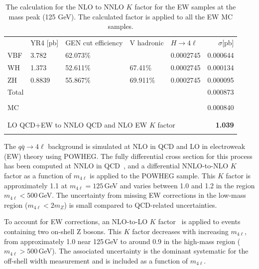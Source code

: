 \begin{table}[!hbt]
\begin{center}
\small
\begin{tabular}{lllllr}
\vspace{-0.2cm} \\
\hline
    & YR4 [pb]    & GEN cut efficiency  & V hadronic & $H\to4\ell$ & $\sigma $[pb]   \\
\hline
VBF & 3.782    & 62.073\% &    & 0.0002745 &  0.000644  \\
WH  & 1.373    & 52.611\% & 67.41\%  & 0.0002745 &  0.000134 \\
ZH  & 0.8839   & 55.867\% & 69.911\%   & 0.0002745 &  0.000095  \\
Total  &          &          &           &           &  0.000873  \\
\vspace{-0.2cm} \\
MC   &          &          &           &           &  0.000840 \\
\vspace{-0.2cm} \\
\hline
\vspace{-0.2cm} \\
\multicolumn{5}{l}{LO QCD+EW to NNLO QCD and NLO EW $K$ factor} &  \textbf{1.039} \\
\vspace{-0.2cm} \\
\hline
\end{tabular}
\caption{The calculation for the NLO to NNLO $K$ factor for the EW \offshell samples at the \Hboson mass peak (125 GeV). 
The calculated factor is applied to all the \offshell EW MC samples.
\label{tab:ew_YR4}}
\end{center}
\end{table}


The $q\bar{q} \to 4\ell$ background is simulated at NLO in QCD and LO in electroweak (EW) theory using POWHEG. The fully differential cross section for this process has been computed at NNLO in QCD~\cite{Grazzini:2015hta}, and a differential NNLO-to-NLO $K$ factor as a function of $m_{4\ell}$ is applied to the POWHEG sample. This $K$ factor is approximately 1.1 at $m_{4\ell} = 125$\,GeV and varies between 1.0 and 1.2 in the region $m_{4\ell} < 500$\,GeV. The uncertainty from missing EW corrections in the low-mass region ($m_{4\ell} < 2m_{Z}$) is small compared to QCD-related uncertainties.

To account for EW corrections, an NLO-to-LO $K$ factor~\cite{Bierweiler:2013dja} is applied to events containing two on-shell Z bosons. This $K$ factor decreases with increasing $m_{4\ell}$, from approximately 1.0 near 125\,GeV to around 0.9 in the high-mass region ($m_{4\ell} > 500$\,GeV). The associated uncertainty is the dominant systematic for the off-shell width measurement and is included as a function of $m_{4\ell}$.

